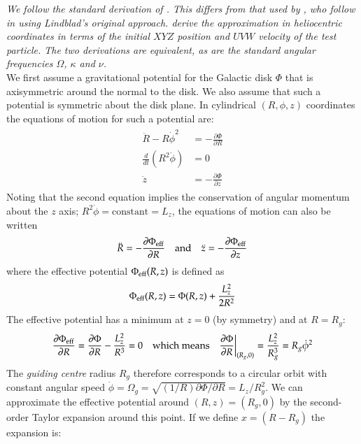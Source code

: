 \vspace{-1cm}\emph{\small We follow the standard derivation of \citet{Murphy12b}. This differs from that used by \cite{Murphy12}, who follow \citet{Murphy11} in using Lindblad's original approach. \citet{Murphy10} derive the approximation in heliocentric coordinates in terms of the initial $XYZ$ position and $UVW$ velocity of the test particle. The two derivations are equivalent, as are the standard angular frequencies $\Omega$, $\kappa$ and $\nu$.}\\

We first assume a gravitational potential for the Galactic disk $\Phi$ that is axisymmetric around the normal to the disk. We also assume that such a potential is symmetric about the disk plane. In cylindrical $(R,\phi,z)$ coordinates the equations of motion for such a potential are:
\begin{align}\label{eqn:eom}
\begin{split}
\ddot{R}-R\dot{\phi}^2& = -\frac{\partial \Phi}{\partial R} \\
\frac{d}{dt}(R^{2}\dot{\phi})& = 0 \\
\ddot{z}&=-\frac{\partial\Phi}{\partial z}
\end{split}
\end{align}
Noting that the second equation implies the conservation of angular momentum about the $z$ axis; $R^{2}\dot{\phi}=\textrm{constant} = L_{z}$, the equations of motion can also be written
\begin{align}\label{eqn:eqnmotion}
\begin{split}
\ddot{R} = -\frac{\partial \Phi_{\rm eff}}{\partial R} \quad\textrm{and}\quad \ddot{z} = -\frac{\partial \Phi_{\rm eff}}{\partial z} 
\end{split}
\end{align}
where the effective potential $\Phi_{\rm eff}(R,z)$ is defined as
\begin{align}
\Phi_{\rm eff}(R,z) = \Phi(R,z) + \frac{L_{z}^{2}}{2R^{2}}
\end{align}
The effective potential has a minimum at $z=0$ (by symmetry) and at $R=R_{g}$:
\begin{align}
\frac{\partial \Phi_{\rm eff}}{\partial R} = \frac{\partial \Phi}{\partial R} - \frac{L_{z}^{2}}{R^{3}} = 0 \quad\textrm{which means}\quad \frac{\partial \Phi}{\partial R}\bigg|_{(R_{g},0)} = \frac{L_{z}^{2}}{R_{g}^{3}} = R_{g}\dot{\phi}^{2}
\end{align}
The \emph{guiding centre} radius $R_{g}$ therefore corresponds to a circular orbit with constant angular speed $\dot{\phi}=\Omega_{g}=\sqrt{(1/R)\partial \Phi/\partial R}=L_{z}/R_{g}^{2}$. We can approximate the effective potential around $(R,z)=(R_{g},0)$ by the second-order Taylor expansion around this point. If we define $x=(R-R_{g})$ the expansion is:
